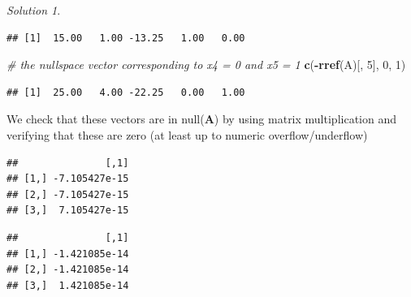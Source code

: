 \documentclass[
]{book}
\newenvironment{Shaded}{\begin{snugshade}}{\end{snugshade}}
\newcommand{\CommentTok}[1]{\textcolor[rgb]{0.56,0.35,0.01}{\textit{#1}}}
\newcommand{\DecValTok}[1]{\textcolor[rgb]{0.00,0.00,0.81}{#1}}
\newcommand{\KeywordTok}[1]{\textcolor[rgb]{0.13,0.29,0.53}{\textbf{#1}}}
\newcommand{\NormalTok}[1]{#1}
\newcommand{\OperatorTok}[1]{\textcolor[rgb]{0.81,0.36,0.00}{\textbf{#1}}}
\newcommand{\StringTok}[1]{\textcolor[rgb]{0.31,0.60,0.02}{#1}}
\theoremstyle{definition}
\theoremstyle{definition}
\theoremstyle{definition}
\theoremstyle{definition}
\theoremstyle{remark}
\newtheorem*{solution}{Solution}
\begin{document}
\begin{solution}
\begin{verbatim}
## [1]  15.00   1.00 -13.25   1.00   0.00
\end{verbatim}

\begin{Shaded}
\begin{Highlighting}[]
\CommentTok{# the nullspace vector corresponding to x4 = 0 and x5 = 1}
\KeywordTok{c}\NormalTok{(}\OperatorTok{-}\KeywordTok{rref}\NormalTok{(A)[, }\DecValTok{5}\NormalTok{], }\DecValTok{0}\NormalTok{, }\DecValTok{1}\NormalTok{)}
\end{Highlighting}
\end{Shaded}

\begin{verbatim}
## [1]  25.00   4.00 -22.25   0.00   1.00
\end{verbatim}

We check that these vectors are in null(\(\mathbf{A}\)) by using matrix multiplication and verifying that these are zero (at least up to numeric overflow/underflow)

\begin{Shaded}
\end{Shaded}

\begin{verbatim}
##               [,1]
## [1,] -7.105427e-15
## [2,] -7.105427e-15
## [3,]  7.105427e-15
\end{verbatim}

\begin{Shaded}
\end{Shaded}

\begin{verbatim}
##               [,1]
## [1,] -1.421085e-14
## [2,] -1.421085e-14
## [3,]  1.421085e-14
\end{verbatim}

\end{solution}
\end{document}
